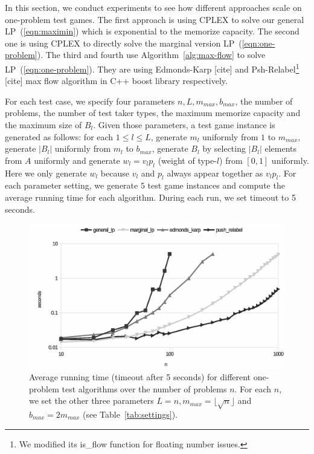 \documentclass{article}
\begin{document}
In this section, we conduct experiments to see how different approaches scale
on one-problem test games. The first approach is using CPLEX to solve our
general LP~(\ref{eqn:maximin}) which is exponential to the memorize capacity.
The second one is using CPLEX to directly solve the marginal version
LP~(\ref{eqn:one-problem}).  The third and fourth use
Algorithm~\ref{alg:max-flow} to solve LP~(\ref{eqn:one-problem}). They are
using Edmonds-Karp [cite] and Psh-Relabel\footnote{We modified its is\_flow
function for floating number issues.} [cite] max flow algorithm in C++ boost
library respectively.


For each test case, we specify four parameters $n, L, m_{max}, b_{max}$,
the number of problems, the number of test taker types, the maximum memorize
capacity and the maximum size of $B_l$. Given those parameters, a test game
instance is generated as follows: for each $1 \leq l \leq L$, generate $m_l$
uniformly from $1$ to $m_{max}$, generate $|B_l|$ uniformly from $m_l$ to
$b_{max}$, generate $B_l$ by selecting $|B_l|$ elements from $A$ uniformly and
generate $w_l = v_l p_l$ (weight of type-$l$) from $[0,1]$ uniformly. Here we
only generate $w_l$ because $v_l$ and $p_l$ always appear together as $v_l
p_l$. For each parameter setting, we generate $5$ test game instances and
compute the average running time for each algorithm. During each run, we set
timeout to 5 seconds. 

\begin{figure}
	\caption{Average running time (timeout after 5 seconds) for different
	one-problem test algorithms over the number of problems $n$. For each
	$n$, we set the other three parameters $L = n, m_{max} = \lfloor
	\sqrt{n} \rfloor$ and $b_{max} = 2m_{max}$ (see
	Table~\ref{tab:settings}).}
	\label{fig:benchmark}
	\includegraphics[trim=0 10mm 0 -5mm, clip, width=\linewidth]{benchmark_all}
\end{figure}
\end{document}
